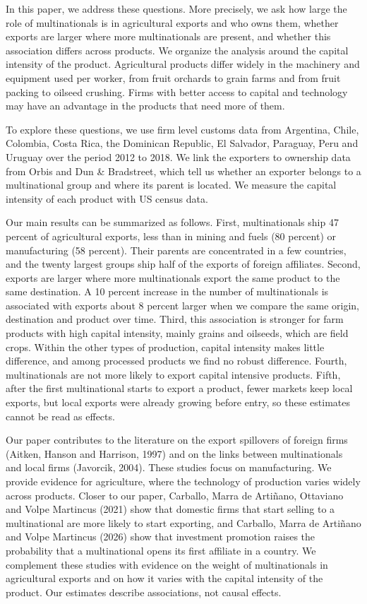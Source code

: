 \documentclass[article, 12pt, 3p]{elsarticle}
\numberwithin{corollary}{proposition}
\begin{document}
In this paper, we address these questions. More precisely, we ask how large the role of multinationals is in
agricultural exports and who owns them, whether exports are larger where more multinationals are present, and whether
this association differs across products. We organize the analysis around the capital intensity of the product.
Agricultural products differ widely in the machinery and equipment used per worker, from fruit orchards to grain farms
and from fruit packing to oilseed crushing. Firms with better access to capital and technology may have an advantage
in the products that need more of them.

To explore these questions, we use firm level customs data from Argentina, Chile, Colombia, Costa Rica, the Dominican
Republic, El Salvador, Paraguay, Peru and Uruguay over the period 2012 to 2018. We link the exporters to ownership data
from Orbis and Dun \& Bradstreet, which tell us whether an exporter belongs to a multinational group and where its
parent is located. We measure the capital intensity of each product with US census data.

Our main results can be summarized as follows. First, multinationals ship 47 percent of agricultural exports, less than
in mining and fuels (80 percent) or manufacturing (58 percent). Their parents are concentrated in a few countries, and
the twenty largest groups ship half of the exports of foreign affiliates. Second, exports are larger where more
multinationals export the same product to the same destination. A 10 percent increase in the number of multinationals
is associated with exports about 8 percent larger when we compare the same origin, destination and product over time.
Third, this association is stronger for farm products with high capital intensity, mainly grains and oilseeds, which
are field crops. Within the other types of production, capital intensity makes little difference, and among processed
products we find no robust difference. Fourth, multinationals are not more likely to export capital intensive
products. Fifth, after the first multinational starts to export a product, fewer markets keep local exports, but local
exports were already growing before entry, so these estimates cannot be read as effects.

Our paper contributes to the literature on the export spillovers of foreign firms (Aitken, Hanson and Harrison, 1997)
and on the links between multinationals and local firms (Javorcik, 2004). These studies focus on manufacturing. We
provide evidence for agriculture, where the technology of production varies widely across products. Closer to our
paper, Carballo, Marra de Arti\~nano, Ottaviano and Volpe Martincus (2021) show that domestic firms that start selling
to a multinational are more likely to start exporting, and Carballo, Marra de Arti\~nano and Volpe Martincus (2026) show
that investment promotion raises the probability that a multinational opens its first affiliate in a country. We
complement these studies with evidence on the weight of multinationals in agricultural exports and on how it varies
with the capital intensity of the product. Our estimates describe associations, not causal effects.
\end{document}
